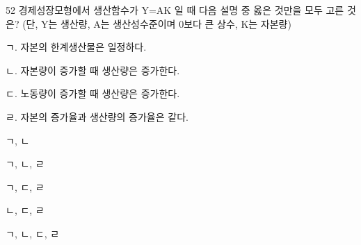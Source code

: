 \begin{question}{52}
경제성장모형에서 생산함수가 Y=AK 일 때 다음 설명 중 옳은 것만을 모두 고른 것은? (단, Y는 생산량, A는 생산성수준이며 0보다 큰 상수, K는 자본량)
\begin{framedtext}
ㄱ. 자본의 한계생산물은 일정하다. \par
ㄴ. 자본량이 증가할 때 생산량은 증가한다. \par
ㄷ. 노동량이 증가할 때 생산량은 증가한다. \par
ㄹ. 자본의 증가율과 생산량의 증가율은 같다.
\end{framedtext}
\begin{choices}
  \item ㄱ, ㄴ
  \item ㄱ, ㄴ, ㄹ
  \item ㄱ, ㄷ, ㄹ
  \item ㄴ, ㄷ, ㄹ
  \item ㄱ, ㄴ, ㄷ, ㄹ
\end{choices}
\end{question}
